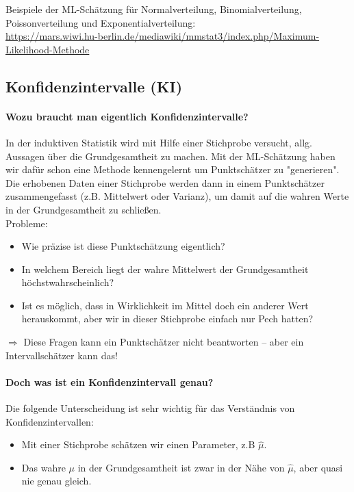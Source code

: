 \documentclass[a4paper]{article}
\newcommand\dangersign{%
 \makebox[1.8em][c]{%
 \makebox[0pt][c]{\raisebox{.15em}{\small!}}%
 \makebox[0pt][c]{\color{red}\Large$\triangle$}}}%
\begin{document}
\noindent Beispiele der ML-Schätzung für Normalverteilung, Binomialverteilung, Poissonverteilung und Exponentialverteilung:\\
\url{https://mars.wiwi.hu-berlin.de/mediawiki/mmstat3/index.php/Maximum-Likelihood-Methode}

\clearpage

\subsection{Konfidenzintervalle (KI)}\label{sec:KI}

\paragraph{Wozu braucht man eigentlich Konfidenzintervalle?} In der induktiven Statistik wird mit Hilfe einer Stichprobe versucht, allg. Aussagen über die Grundgesamtheit zu machen. Mit der ML-Schätzung haben wir dafür schon eine Methode kennengelernt um Punktschätzer zu "generieren". Die erhobenen Daten einer Stichprobe werden dann in einem Punktschätzer zusammengefasst (z.B. Mittelwert oder Varianz), um damit auf die wahren Werte in der Grundgesamtheit zu schließen.\\

\noindent \dangersign Probleme:

\begin{itemize}
    \item Wie präzise ist diese Punktschätzung eigentlich?
    \item In welchem Bereich liegt der wahre Mittelwert der Grundgesamtheit höchstwahrscheinlich?
    \item Ist es möglich, dass in Wirklichkeit im Mittel doch ein anderer Wert herauskommt, aber wir in dieser Stichprobe einfach nur Pech hatten?
\end{itemize}

\noindent $\Rightarrow$ Diese Fragen kann ein Punktschätzer nicht beantworten – aber ein Intervallschätzer kann das!

\paragraph{Doch was ist ein Konfidenzintervall genau?} Die folgende Unterscheidung ist sehr wichtig für das Verständnis von Konfidenzintervallen:

\begin{itemize}
    \item Mit einer Stichprobe schätzen wir einen Parameter, z.B $\hat{\mu}$.
    \item Das wahre $\mu$ in der Grundgesamtheit ist zwar in der Nähe von $\hat{\mu}$, aber quasi nie genau gleich.
\end{itemize}
\end{document}
